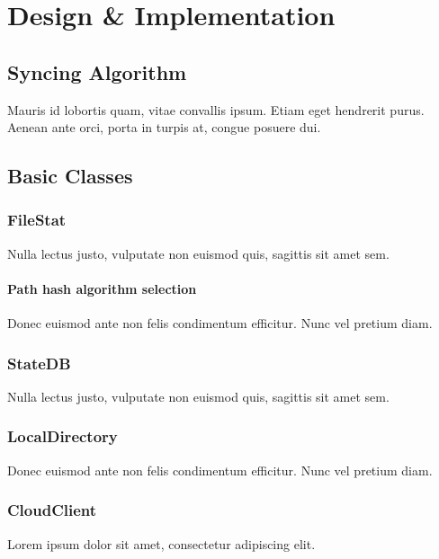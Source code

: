 
\chapter{Design \& Implementation}


\section{Syncing Algorithm}
  Mauris id lobortis quam, vitae convallis ipsum. Etiam eget hendrerit purus.
  Aenean ante orci, porta in turpis at, congue posuere dui.

\section{Basic Classes}
  \subsection{FileStat}
    Nulla lectus justo, vulputate non euismod quis, sagittis sit amet sem.
    \subsubsection{Path hash algorithm selection}
      Donec euismod ante non felis condimentum efficitur. Nunc vel pretium diam.
  \subsection{StateDB}
    Nulla lectus justo, vulputate non euismod quis, sagittis sit amet sem.
  \subsection{LocalDirectory}
    Donec euismod ante non felis condimentum efficitur. Nunc vel pretium diam.
  \subsection{CloudClient}
    Lorem ipsum dolor sit amet, consectetur adipiscing elit.
